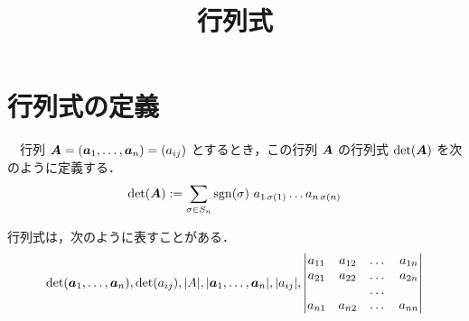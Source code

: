 \documentclass[leqno,autodetect-engine, dvipdfmx-if-dvi,ja=standard]{bxjsarticle}
\title{行列式}
\begin{document}
	
	\section{行列式の定義}
	
		\begin{dfn}　行列 $\boldsymbol{A} = (\boldsymbol{a}_1, \dots,\boldsymbol{a}_n) = (a_{i j})$ とするとき，この行列 $\boldsymbol{A}$ の行列式 $\det(\boldsymbol{A})$ を次のように定義する．
			\begin{equation}
				\det(\boldsymbol{A}) := \sum_{\sigma \in S_n} \operatorname{\mathrm{sgn}}(\sigma) \ a_{1 \, \sigma(1)} \dots a_{n \, \sigma(n)}
			\end{equation}
		
			行列式は，次のように表すことがある．
			\begin{equation}
				\det(\boldsymbol{a}_1,\dots,\boldsymbol{a}_n), \det(a_{i j}), \rvert A \lvert,  \rvert \boldsymbol{a}_1, \dots, \boldsymbol{a}_n \lvert, \rvert a_{i j} \lvert,
				\begin{vmatrix}
					a_{1 1} & a_{1 2} & \dots & a_{1 n} \\
					a_{2 1} & a_{2 2} & \dots & a_{2 n } \\
					           &             & \dots &              \\
					a_{n 1} & a_{n 2} & \dots & a_{n n}					           
				\end{vmatrix}
			\end{equation}
		\end{dfn}
	

		
\end{document}
